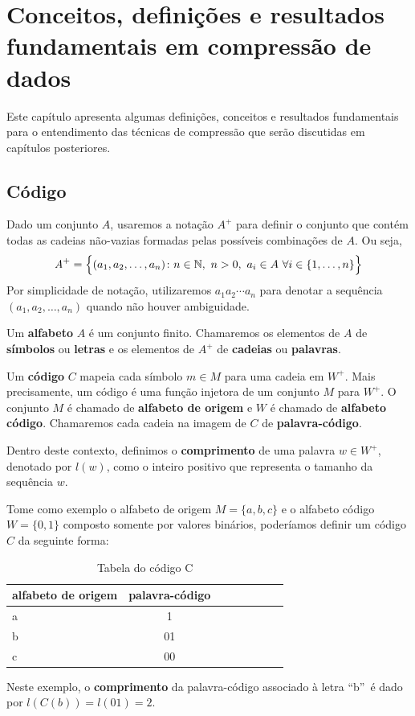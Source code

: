 \chapter{Conceitos, definições e resultados fundamentais em compressão de dados} \label{chapter:fund}

Este capítulo apresenta algumas definições, conceitos e resultados fundamentais para o entendimento das técnicas de compressão que serão discutidas em capítulos posteriores.

\section{Código}

Dado um conjunto $A$, usaremos a notação $A^+$ para definir o conjunto
que contém todas as cadeias não-vazias formadas pelas possíveis
combinações de $A$. Ou seja,
\begin{equation*}
  \emph{A}^+ = \Big\{
  (a_1,a_2,\dotsc, a_n) \colon n\in\mathbb{N}, \ n>0,
  \ a_i \in A \ \forall i \in \{1,\dotsc,n\} 
  \Big\}
\end{equation*}
Por simplicidade de notação, utilizaremos $a_1a_2\dotsm a_n$ para
denotar a sequência $(a_1,a_2,\dotsc, a_n)$ quando não houver
ambiguidade.

Um \textbf{alfabeto} $A$ é um conjunto finito. Chamaremos os elementos
de $A$ de \textbf{símbolos} ou \textbf{letras} e os elementos de $A^+$
de \textbf{cadeias} ou \textbf{palavras}.

Um \textbf{código} $C$ mapeia cada símbolo $m \in M$ para uma cadeia
em $W^+$. Mais precisamente, um código é uma função injetora de um
conjunto $M$ para $W^+$. O conjunto $M$ é chamado de \textbf{alfabeto
  de origem} e $W$ é chamado de \textbf{alfabeto código}. Chamaremos
cada cadeia na imagem de $C$ de \textbf{palavra-código}.

Dentro deste contexto, definimos o \textbf{comprimento} de uma palavra
$w\in W^+$, denotado por $l(w)$, como o inteiro positivo que
representa o tamanho da sequência $w$.

Tome como exemplo o alfabeto de origem $M = \{a, b, c\}$ e o alfabeto
código $W = \{0, 1\}$ composto somente por valores binários,
poderíamos definir um código $C$ da seguinte forma:

\begin{table}[!h]
   \centering
   \caption{Tabela do código C} \label{tab:vcode}
   \begin{tabular}{|l|c|c|c|c|c|c|r|}
        \hline
        \small{alfabeto de origem} & \small{palavra-código} \\ \hline
              a &   1   \\ \hline
              b &   01  \\ \hline
              c &   00  \\ \hline
  \end{tabular}
\end{table}
Neste exemplo, o \textbf{comprimento} da palavra-código associado à
letra ``b''~é dado por $l(C(b)) = l(01) = 2$.

